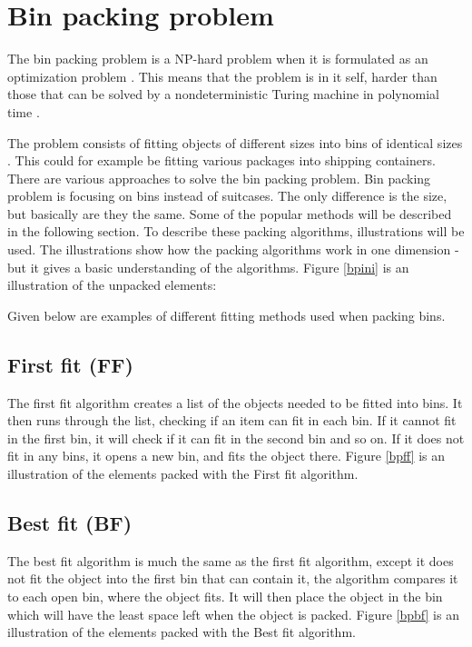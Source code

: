 \section{Bin packing problem}
\label{sec:binpacking}

The bin packing problem is a NP-hard problem when it is formulated as an optimization problem \citep{binpackinggsu}. This means that the problem is in it self, harder than those that can be solved by a nondeterministic Turing machine in polynomial time \citep{nphardnist}.


The problem consists of fitting objects of different sizes into bins of identical sizes \citep{appofdismath}. This could for example be fitting various packages into shipping containers. There are various approaches to solve the bin packing problem. Bin packing problem is focusing on bins instead of suitcases. The only difference is the size, but basically are they the same. Some of the popular methods will be described in the following section. To describe these packing algorithms, illustrations will be used. The illustrations show how the packing algorithms work in one dimension - but it gives a basic understanding of the algorithms. Figure \ref{bpini} is an illustration of the unpacked elements:

Given below are examples of different fitting methods used when packing bins.

\subsection{First fit (FF)}
The first fit algorithm creates a list of the objects needed to be fitted into bins. It then runs through the list, checking if an item can fit in each bin. If it cannot fit in the first bin, it will check if it can fit in the second bin and so on. If it does not fit in any bins, it opens a new bin, and fits the object there. Figure \ref{bpff} is an illustration of the elements packed with the First fit algorithm.

\subsection{Best fit (BF)}
The best fit algorithm is much the same as the first fit algorithm, except it does not fit the object into the first bin that can contain it, the algorithm compares it to each open bin, where the object fits. It will then place the object in the bin which will have the least space left when the object is packed. Figure \ref{bpbf} is an illustration of the elements packed with the Best fit algorithm.

